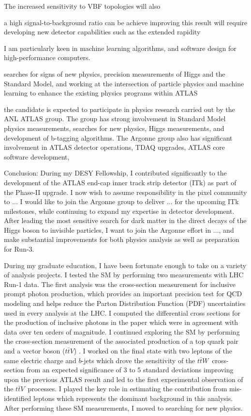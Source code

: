 \documentclass[a4paper]{article}
\newcommand{\ttbarV}{\ensuremath{t\bar{t}V}}
\newcommand{\ttbarW}{\ensuremath{t\bar{t}W}}
\begin{document}
The increased sensitivity
to VBF topologies will also

a high signal-to-background ratio can be achieve
improving this result will require developing new detector capabilities such as the extended rapidity

I am particularly keen in machine learning algorithms, and software design for high-performance computers.


searches for signs of new physics, precision measurements of Higgs and the Standard Model, and working at the intersection of particle physics and machine learning to enhance the existing physics programs within ATLAS


the candidate is expected to participate in physics research carried out by the ANL ATLAS group. The group has strong involvement in Standard Model physics measurements, searches for new physics, Higgs measurements, and development of b-tagging algorithms. The Argonne group also has significant involvement in ATLAS detector operations, TDAQ upgrades, ATLAS core software development,


Conclusion:
During my DESY Fellowship, I contributed significantly to the development of the ATLAS end-cap inner track strip detector (ITk) as part of the Phase-II upgrade. I now wish to assume responsibility in the pixel community to ...
I would like to join the Argonne group to deliver ... for the upcoming ITk milestones, while continuing to expand my expertise in detector development.
After leading the most sensitive search for dark matter in the direct decays of the Higgs boson to invisible particles, I want to join the
Argonne effort in ..., and make substantial improvements for both physics analysis as well as preparation for Run-3.


During my graduate education, I have been fortunate enough to take on a variety of analysis projects. I tested the SM by performing two measurements
with LHC Run-1 data. The first analysis was the cross-section measurement for inclusive prompt photon production,
which provides an important precision test for QCD modeling and helps reduce the Parton Distribution Function (PDF) uncertainties used in
every analysis at the LHC. I computed the differential cross sections for the production of inclusive photons
in the paper \cite{paper-2015-Photon} which were in agreement with data over ten orders of magnitude.
I continued exploring the SM by performing the cross-section measurement of the associated production of a top quark pair
and a vector boson (\ttbarV) \cite{paper-2015-ttV}.
I worked on the final state with two leptons of the same electric charge and $b$-jets which
drove the sensitivity of the \ttbarW~cross-section from an expected significance of 3 to 5 standard deviations improving upon the previous ATLAS result
and led to the first experimental observation of the \ttbarV~processes.
I played the key role in estimating the contribution from mis-identified leptons which represents the dominant background in this analysis.
After performing these SM measurements, I moved to searching for new physics.
\end{document}
